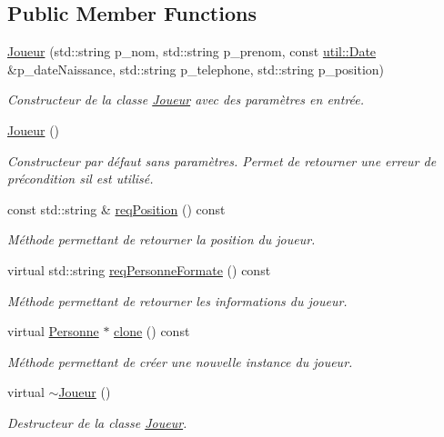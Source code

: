 \subsection*{Public Member Functions}
\begin{DoxyCompactItemize}
\item 
\hyperlink{classhockey_1_1Joueur_a07cc484db0a5b94fb425aff475c123e2}{Joueur} (std\+::string p\+\_\+nom, std\+::string p\+\_\+prenom, const \hyperlink{classutil_1_1Date}{util\+::\+Date} \&p\+\_\+date\+Naissance, std\+::string p\+\_\+telephone, std\+::string p\+\_\+position)
\begin{DoxyCompactList}\small\item\em Constructeur de la classe \hyperlink{classhockey_1_1Joueur}{Joueur} avec des paramètres en entrée. \end{DoxyCompactList}\item 
\mbox{\label{classhockey_1_1Joueur_a822dae0ca7b05d7637eab533656dfe22}} 
\hyperlink{classhockey_1_1Joueur_a822dae0ca7b05d7637eab533656dfe22}{Joueur} ()
\begin{DoxyCompactList}\small\item\em Constructeur par défaut sans paramètres. Permet de retourner une erreur de précondition s\textquotesingle{}il est utilisé. \end{DoxyCompactList}\item 
const std\+::string \& \hyperlink{classhockey_1_1Joueur_a7c9bc7262096861271b4e0431dcd1693}{req\+Position} () const
\begin{DoxyCompactList}\small\item\em Méthode permettant de retourner la position du joueur. \end{DoxyCompactList}\item 
virtual std\+::string \hyperlink{classhockey_1_1Joueur_ab3d6b15e55aa765807e4960108f7db29}{req\+Personne\+Formate} () const
\begin{DoxyCompactList}\small\item\em Méthode permettant de retourner les informations du joueur. \end{DoxyCompactList}\item 
virtual \hyperlink{classhockey_1_1Personne}{Personne} $\ast$ \hyperlink{classhockey_1_1Joueur_a29a2fc040b74bf3bf72d7670012c9bff}{clone} () const
\begin{DoxyCompactList}\small\item\em Méthode permettant de créer une nouvelle instance du joueur. \end{DoxyCompactList}\item 
\mbox{\label{classhockey_1_1Joueur_a3f385cd26133b8fe8c2afce4c70c9ece}} 
virtual \hyperlink{classhockey_1_1Joueur_a3f385cd26133b8fe8c2afce4c70c9ece}{$\sim$\+Joueur} ()
\begin{DoxyCompactList}\small\item\em Destructeur de la classe \hyperlink{classhockey_1_1Joueur}{Joueur}. \end{DoxyCompactList}\end{DoxyCompactItemize}
